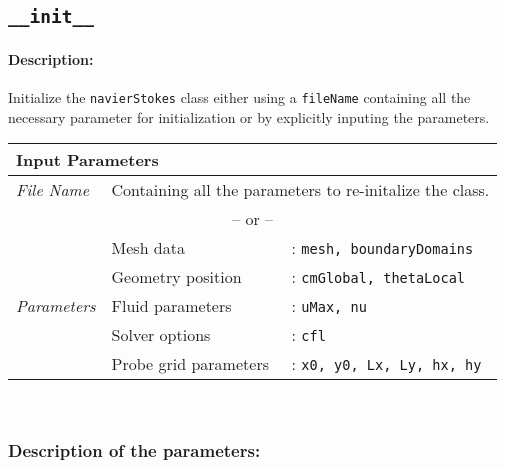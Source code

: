 \subsection*{\texttt{\_\_init\_\_}}
	\paragraph{Description:} Initialize the \texttt{navierStokes} class either using a \texttt{fileName} containing all the necessary parameter for initialization or by explicitly inputing the parameters.\\

	\begin{tabular}{l|lp{7cm}}
		\multicolumn{2}{l}{\textbf{Input Parameters}} & \\ \hline
		\textit{File Name} & \multicolumn{2}{l}{Containing all the parameters to re-initalize the class.} \\ \hline
		\multicolumn{3}{c}{-- or --} \\ \hline
		\multirow{5}{*}{\textit{Parameters}} & Mesh data &: \texttt{mesh, boundaryDomains}\\ \cline{2-3}
		& Geometry position &: \texttt{cmGlobal, thetaLocal} \\ \cline{2-3}
		& Fluid parameters &: \texttt{uMax, nu}\\ \cline{2-3}
		& Solver options &: \texttt{cfl}\\ \cline{2-3}
		& Probe grid parameters &: \texttt{x0, y0, Lx, Ly, hx, hy}\\ \cline{2-3}

	\end{tabular}\\
	\subsubsection*{Description of the parameters:}
	
